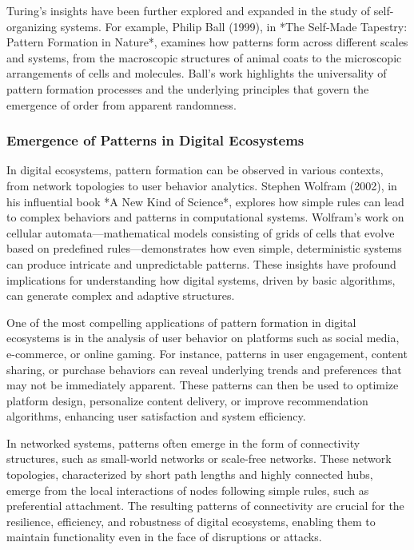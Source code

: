 \documentclass[12pt,twoside]{article}
\begin{document}
Turing's insights have been further explored and expanded in the study of self-organizing systems. For example, Philip Ball (1999), in *The Self-Made Tapestry: Pattern Formation in Nature*, examines how patterns form across different scales and systems, from the macroscopic structures of animal coats to the microscopic arrangements of cells and molecules. Ball's work highlights the universality of pattern formation processes and the underlying principles that govern the emergence of order from apparent randomness.

\subsubsection{Emergence of Patterns in Digital Ecosystems}

In digital ecosystems, pattern formation can be observed in various contexts, from network topologies to user behavior analytics. Stephen Wolfram (2002), in his influential book *A New Kind of Science*, explores how simple rules can lead to complex behaviors and patterns in computational systems. Wolfram's work on cellular automata—mathematical models consisting of grids of cells that evolve based on predefined rules—demonstrates how even simple, deterministic systems can produce intricate and unpredictable patterns. These insights have profound implications for understanding how digital systems, driven by basic algorithms, can generate complex and adaptive structures.

One of the most compelling applications of pattern formation in digital ecosystems is in the analysis of user behavior on platforms such as social media, e-commerce, or online gaming. For instance, patterns in user engagement, content sharing, or purchase behaviors can reveal underlying trends and preferences that may not be immediately apparent. These patterns can then be used to optimize platform design, personalize content delivery, or improve recommendation algorithms, enhancing user satisfaction and system efficiency.

In networked systems, patterns often emerge in the form of connectivity structures, such as small-world networks or scale-free networks. These network topologies, characterized by short path lengths and highly connected hubs, emerge from the local interactions of nodes following simple rules, such as preferential attachment. The resulting patterns of connectivity are crucial for the resilience, efficiency, and robustness of digital ecosystems, enabling them to maintain functionality even in the face of disruptions or attacks.
\end{document}
